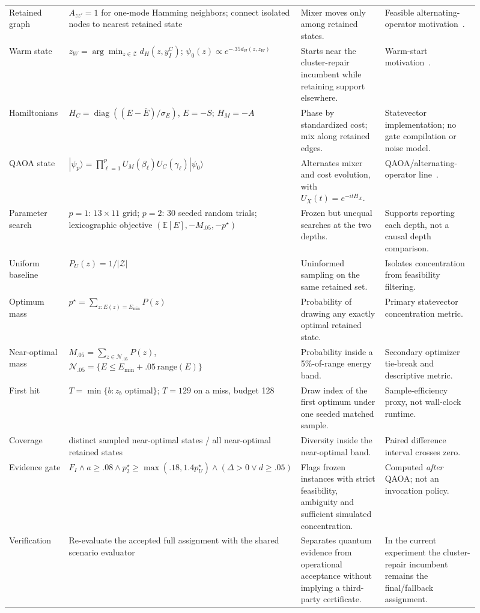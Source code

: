 \begin{longtable}{@{}p{0.14\linewidth}p{0.25\linewidth}p{0.25\linewidth}p{0.27\linewidth}@{}}
Retained graph & $A_{zz'}=1$ for one-mode Hamming neighbors; connect isolated nodes to nearest retained state & Mixer moves only among retained states. & Feasible alternating-operator motivation~\citep{hadfield2019alternating,sawaya2023mixers}. \\
Warm state & $z_W=\arg\min_{z\in\mathcal Z}d_H(z,y^C_I)$; $\psi_0(z)\propto e^{-.35d_H(z,z_W)}$ & Starts near the cluster-repair incumbent while retaining support elsewhere. & Warm-start motivation~\citep{egger2021warm}. \\
Hamiltonians & $H_C=\operatorname{diag}((E-\bar E)/\sigma_E)$, $E=-S$; $H_M=-A$ & Phase by standardized cost; mix along retained edges. & Statevector implementation; no gate compilation or noise model. \\
QAOA state & $|\psi_p\rangle=\prod_{\ell=1}^p U_M(\beta_\ell)U_C(\gamma_\ell)|\psi_0\rangle$ & Alternates mixer and cost evolution, with $U_X(t)=e^{-itH_X}$. & QAOA/alternating-operator line~\citep{farhi2014qaoa,hadfield2019alternating,blekos2024review}. \\
Parameter search & $p=1$: $13\times11$ grid; $p=2$: 30 seeded random trials; lexicographic objective $(\mathbb E[E],-M_{.05},-p^\star)$ & Frozen but unequal searches at the two depths. & Supports reporting each depth, not a causal depth comparison. \\
Uniform baseline & $P_U(z)=1/|\mathcal Z|$ & Uninformed sampling on the same retained set. & Isolates concentration from feasibility filtering. \\
Optimum mass & $p^\star=\sum_{z:E(z)=E_{\min}}P(z)$ & Probability of drawing any exactly optimal retained state. & Primary statevector concentration metric. \\
Near-optimal mass & $M_{.05}=\sum_{z\in\mathcal N_{.05}}P(z)$, $\mathcal N_{.05}=\{E\le E_{\min}+.05\,\mathrm{range}(E)\}$ & Probability inside a 5\%-of-range energy band. & Secondary optimizer tie-break and descriptive metric. \\
First hit & $T=\min\{b:z_b\text{ optimal}\}$; $T=129$ on a miss, budget 128 & Draw index of the first optimum under one seeded matched sample. & Sample-efficiency proxy, not wall-clock runtime. \\
Coverage & distinct sampled near-optimal states / all near-optimal retained states & Diversity inside the near-optimal band. & Paired difference interval crosses zero. \\
Evidence gate & $F_I\land a\ge.08\land p_2^\star\ge\max(.18,1.4p_U^\star)\land(\Delta>0\lor d\ge.05)$ & Flags frozen instances with strict feasibility, ambiguity and sufficient simulated concentration. & Computed \emph{after} QAOA; not an invocation policy. \\
Verification & Re-evaluate the accepted full assignment with the shared scenario evaluator & Separates quantum evidence from operational acceptance without implying a third-party certificate. & In the current experiment the cluster-repair incumbent remains the final/fallback assignment. \\
\bottomrule
\end{longtable}
\endgroup
